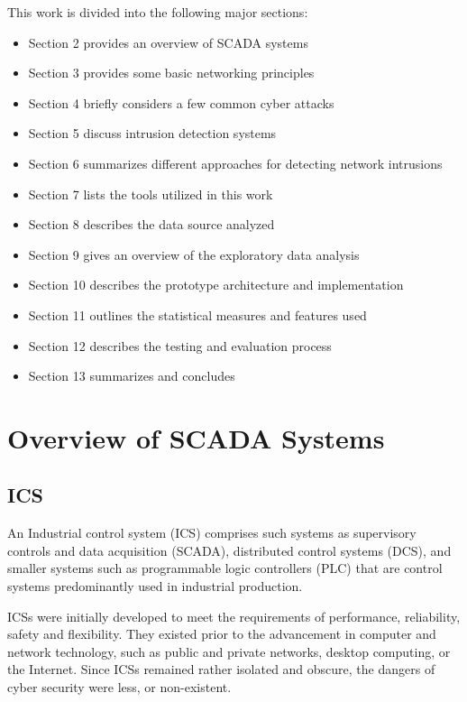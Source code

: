 \documentclass[12pt,]{article}
\begin{document}
This work is divided into the following major sections:

\begin{itemize}
\itemsep1pt\parskip0pt
\item
  Section 2 provides an overview of SCADA systems
\item
  Section 3 provides some basic networking principles
\item
  Section 4 briefly considers a few common cyber attacks
\item
  Section 5 discuss intrusion detection systems
\item
  Section 6 summarizes different approaches for detecting network
  intrusions
\item
  Section 7 lists the tools utilized in this work
\item
  Section 8 describes the data source analyzed
\item
  Section 9 gives an overview of the exploratory data analysis
\item
  Section 10 describes the prototype architecture and implementation
\item
  Section 11 outlines the statistical measures and features used
\item
  Section 12 describes the testing and evaluation process
\item
  Section 13 summarizes and concludes
\end{itemize}

\pagebreak

\section{Overview of SCADA Systems}\label{overview-of-scada-systems}

\subsection{ICS}\label{ics}

An Industrial control system (ICS) comprises such systems as supervisory
controls and data acquisition (SCADA), distributed control systems
(DCS), and smaller systems such as programmable logic controllers (PLC)
that are control systems predominantly used in industrial production.

ICSs were initially developed to meet the requirements of performance,
reliability, safety and flexibility. They existed prior to the
advancement in computer and network technology, such as public and
private networks, desktop computing, or the Internet. Since ICSs
remained rather isolated and obscure, the dangers of cyber security were
less, or non-existent.
\end{document}
